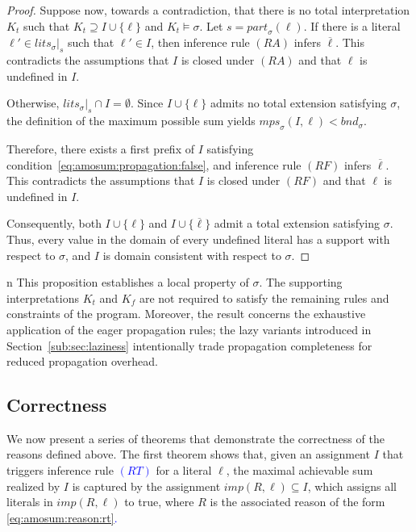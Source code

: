 \documentclass[preprint,authoryear]{elsarticle}
\newcommand{\lits}{\mathit{lits}}
\newcommand{\mps}{\mathit{mps}}
\newcommand{\bnd}{\mathit{bnd}}
\theoremstyle{definition}
\begin{document}
{\begin{proof}
Suppose now, towards a contradiction, that there is no total interpretation $K_t$ such that $K_t \supseteq I \cup \{\ell\}$ and $K_t \models \sigma$.
Let $s = \mathit{part}_\sigma(\ell)$. If there is a literal $\ell' \in \lits_\sigma|_s$ such that $\ell' \in I$, then inference rule $(RA)$ infers $\overline{\ell}$. This contradicts the assumptions that $I$ is closed under $(RA)$ and that $\ell$ is undefined in $I$.

Otherwise, $\lits_\sigma|_s \cap I = \emptyset$. Since $I \cup \{\ell\}$ admits no total extension satisfying $\sigma$, the definition of the maximum possible sum yields $\mps_\sigma(I,\ell) < \bnd_\sigma$.

Therefore, there exists a first prefix of $I$ satisfying condition~\eqref{eq:amosum:propagation:false}, and inference rule $(RF)$ infers $\overline{\ell}$. This contradicts the assumptions that $I$ is closed under $(RF)$ and that $\ell$ is undefined in $I$.

Consequently, both $I \cup \{\ell\}$ and $I \cup \{\overline{\ell}\}$ admit a total extension satisfying $\sigma$. Thus, every value in the domain of every undefined literal has a support with respect to $\sigma$, and $I$ is domain consistent with respect to $\sigma$.
\end{proof}
n
\noindent
This proposition establishes a local property of $\sigma$. The supporting interpretations $K_t$ and $K_f$ are not required to satisfy the remaining rules and constraints of the program. Moreover, the result concerns the exhaustive application of the eager propagation rules; the lazy variants introduced in Section~\ref{sub:sec:laziness} intentionally trade propagation completeness for reduced propagation overhead.

}


\subsection{Correctness}

\label{sec:correctness}
We now present a series of theorems that demonstrate the correctness of the reasons defined above.
The first theorem shows that, given an assignment $I$ that triggers inference rule \textcolor{blue}{$(RT)$} for a literal $\ell$, the maximal achievable sum realized by $I$ is captured by the assignment $\mathit{imp}(R,\ell) \subseteq I$, which assigns all literals in $\mathit{imp}(R,\ell) $ to true, where $R$ is the associated reason of the form \textcolor{blue}{\eqref{eq:amosum:reason:rt}.}
\end{document}
